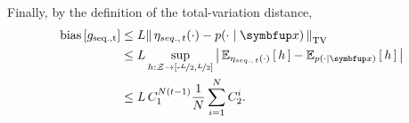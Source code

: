 \begin{proofEnd}
  Finally, by the definition of the total-variation distance, 
 \begin{align}
   \mathrm{bias}\left[ g_{\mathrm{seq., t}} \right]
   &\leq L \DTV{\eta_{seq.,\, t}(\cdot)}{p(\cdot\mid\vx)} \\
   &\leq L \sup_{h : \mathcal{Z} \rightarrow \left[ \text{-}\nicefrac{L}{2}, \nicefrac{L}{2} \right]} \left|\, \Esub{\eta_{seq.,\, t}(\cdot)}{h} - \Esub{p(\cdot\mid\vx)}{h} \,\right| \\
   &\leq L \, C_1^{N (t-1)} \frac{1}{N} \sum_{i=1}^N C_2^i.
 \end{align}
\end{proofEnd}

